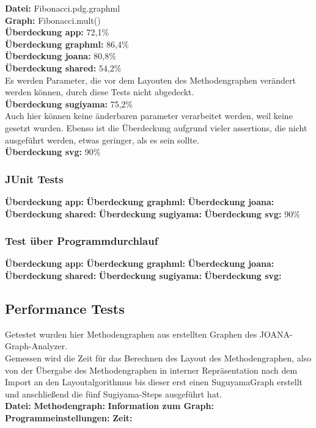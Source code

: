 \textbf{Datei: }Fibonacci.pdg.graphml\\
\textbf{Graph: }Fibonacci.mult()\\
\textbf{Überdeckung app: }72,1\%\\
\textbf{Überdeckung graphml: }86,4\%\\
\textbf{Überdeckung joana: }80,8\%\\
\textbf{Überdeckung shared: }54,2\%\\
Es werden Parameter, die vor dem Layouten des Methodengraphen verändert werden können, durch diese Tests nicht abgedeckt.\\
\textbf{Überdeckung sugiyama: }75,2\%\\
Auch hier können keine änderbaren parameter verarbeitet werden, weil keine gesetzt wurden. Ebenso ist die Überdeckung aufgrund vieler assertions, die nicht ausgeführt werden, etwas geringer, als es sein sollte.\\
\textbf{Überdeckung svg: }90\%\\
\subsubsection{JUnit Tests}

\textbf{Überdeckung app: }
\textbf{Überdeckung graphml: }
\textbf{Überdeckung joana: }
\textbf{Überdeckung shared: }
\textbf{Überdeckung sugiyama: }
\textbf{Überdeckung svg: }90\%\\

\subsubsection{Test über Programmdurchlauf}

\textbf{Überdeckung app: }
\textbf{Überdeckung graphml: }
\textbf{Überdeckung joana: }
\textbf{Überdeckung shared: }
\textbf{Überdeckung sugiyama: }
\textbf{Überdeckung svg: }

\subsection{Performance Tests}
Getestet wurden hier Methodengraphen aus erstellten Graphen des JOANA-Graph-Analyzer.\\
Gemessen wird die Zeit für das Berechnen des Layout des Methodengraphen, also von der Übergabe des Methodengraphen in interner Repräsentation nach dem Import an den Layoutalgorithmus bis dieser erst einen SuguyamaGraph erstellt und anschließend die fünf Sugiyama-Steps ausgeführt hat.\\

\textbf{Datei: }
\textbf{Methodengraph: }
\textbf{Information zum Graph: }
\textbf{Programmeinstellungen: }
\textbf{Zeit: }



